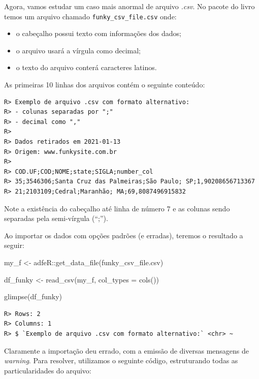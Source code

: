 \documentclass[
  11pt,
]{book}
\newenvironment{Shaded}{\begin{snugshade}}{\end{snugshade}}
\newcommand{\AttributeTok}[1]{\textcolor[rgb]{0.61,0.61,0.61}{#1}}
\newcommand{\FunctionTok}[1]{\textcolor[rgb]{0,0,0}{#1}}
\newcommand{\NormalTok}[1]{#1}
\newcommand{\OtherTok}[1]{\textcolor[rgb]{0.37,0.37,0.37}{#1}}
\newcommand{\SpecialCharTok}[1]{\textcolor[rgb]{0,0,0}{#1}}
\newcommand{\StringTok}[1]{\textcolor[rgb]{0.5,0.5,0.5}{#1}}
\providecommand{\tightlist}{%
  \setlength{\itemsep}{0pt}\setlength{\parskip}{0pt}}
\begin{document}
Agora, vamos estudar um caso mais anormal de arquivo \emph{.csv}. No pacote do livro temos um arquivo chamado \texttt{funky\_csv\_file.csv} onde:

\begin{itemize}
\tightlist
\item
  o cabeçalho possui texto com informações dos dados;
\item
  o arquivo usará a vírgula como decimal;
\item
  o texto do arquivo conterá caracteres latinos.
\end{itemize}

As primeiras 10 linhas dos arquivos contém o seguinte conteúdo:

\begin{verbatim}
R> Exemplo de arquivo .csv com formato alternativo:
R> - colunas separadas por ";"
R> - decimal como ","
R> 
R> Dados retirados em 2021-01-13
R> Origem: www.funkysite.com.br
R> 
R> COD.UF;COD;NOME;state;SIGLA;number_col
R> 35;3546306;Santa Cruz das Palmeiras;São Paulo; SP;1,90208656713367
R> 21;2103109;Cedral;Maranhão; MA;69,8087496915832
\end{verbatim}

Note a existência do cabeçalho até linha de número 7 e as colunas sendo separadas pela semi-vírgula (``;'').

Ao importar os dados com opções padrões (e erradas), teremos o resultado a seguir:

\begin{Shaded}
\begin{Highlighting}[]
\NormalTok{my\_f }\OtherTok{\textless{}{-}}\NormalTok{ adfeR}\SpecialCharTok{::}\FunctionTok{get\_data\_file}\NormalTok{(}\StringTok{\textquotesingle{}funky\_csv\_file.csv\textquotesingle{}}\NormalTok{)}

\NormalTok{df\_funky }\OtherTok{\textless{}{-}} \FunctionTok{read\_csv}\NormalTok{(my\_f, }
                     \AttributeTok{col\_types =} \FunctionTok{cols}\NormalTok{())}

\FunctionTok{glimpse}\NormalTok{(df\_funky)}
\end{Highlighting}
\end{Shaded}

\begin{verbatim}
R> Rows: 2
R> Columns: 1
R> $ `Exemplo de arquivo .csv com formato alternativo:` <chr> ~
\end{verbatim}

Claramente a importação deu errado, com a emissão de diversas mensagens de \emph{warning}. Para resolver, utilizamos o seguinte código, estruturando todas as particularidades do arquivo:
\end{document}
